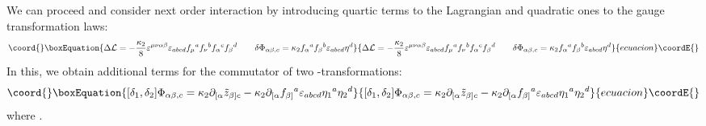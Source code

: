 \documentclass[a4paper,12pt]{article}
\begin{document}
We can proceed and consider next order interaction by introducing
quartic terms to the Lagrangian and quadratic ones to the gauge
transformation laws:
\begin{equation}\coord{}\boxEquation{
\Delta {\cal L} = - \frac{\kappa_2}{8} \varepsilon^{\mu\nu\alpha\beta}
\varepsilon_{abcd} f_\mu{}^a f_\nu{}^b f_\alpha{}^c f_\beta{}^d \qquad
\delta \Phi_{\alpha\beta,c} = \kappa_2 f_\alpha{}^a f_\beta{}^b
\varepsilon_{abcd} \eta^d
}{
\Delta {\cal L} = - \frac{\kappa_2}{8} \varepsilon^{\mu\nu\alpha\beta}
\varepsilon_{abcd} f_\mu{}^a f_\nu{}^b f_\alpha{}^c f_\beta{}^d \qquad
\delta \Phi_{\alpha\beta,c} = \kappa_2 f_\alpha{}^a f_\beta{}^b
\varepsilon_{abcd} \eta^d
}{ecuacion}\coordE{}\end{equation}
In this, we obtain additional terms for the commutator of two
\myHighlight{$\eta$}\coordHE{}-transformations:
\begin{equation}\coord{}\boxEquation{
[\delta_1, \delta_2] \Phi_{\alpha\beta,c} = \kappa_2
\partial_{[\alpha} \tilde{z}_{\beta]c} - \kappa_2 \partial_{[\alpha}
f_{\beta]}{}^a \varepsilon_{abcd} \eta_1{}^a \eta_2{}^d
}{
[\delta_1, \delta_2] \Phi_{\alpha\beta,c} = \kappa_2
\partial_{[\alpha} \tilde{z}_{\beta]c} - \kappa_2 \partial_{[\alpha}
f_{\beta]}{}^a \varepsilon_{abcd} \eta_1{}^a \eta_2{}^d
}{ecuacion}\coordE{}\end{equation}
where \coordHE{}.
\end{document}
